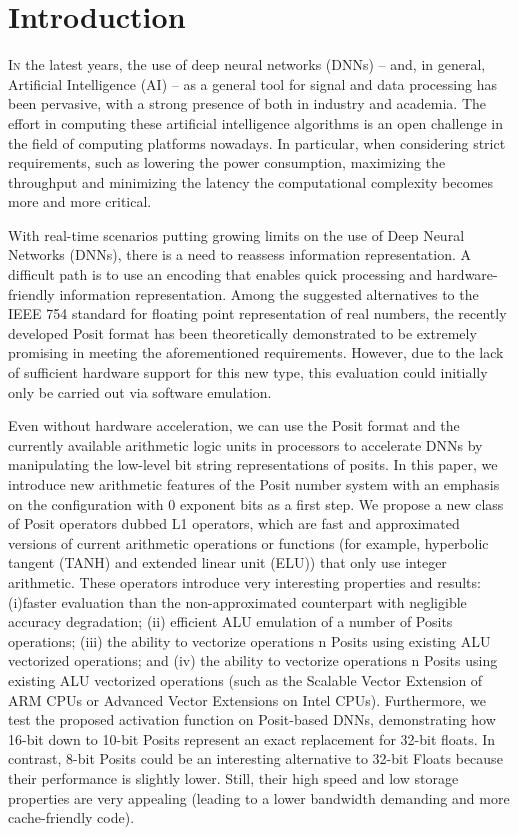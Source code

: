 \chapter{Introduction}
\lettrine{I}{n} the latest years, the use of deep neural networks (DNNs) -- and, in general, Artificial Intelligence (AI) -- as a general tool for signal and data processing has been pervasive, with a strong presence of both in industry and academia. The effort in computing these artificial intelligence algorithms is an open challenge in the field of computing platforms nowadays. In particular, when considering strict requirements, such as lowering the power consumption, maximizing the throughput and minimizing the latency the computational complexity becomes more and more critical.


With real-time scenarios putting growing limits on the use of Deep Neural Networks (DNNs), there is a need to reassess information representation. A difficult path is to use an encoding that enables quick processing and hardware-friendly information representation. Among the suggested alternatives to the IEEE 754 standard for floating point representation of real numbers, the recently developed Posit format has been theoretically demonstrated to be extremely promising in meeting the aforementioned requirements. However, due to the lack of sufficient hardware support for this new type, this evaluation could initially only be carried out via software emulation.

Even without hardware acceleration, we can use the Posit format and the currently available arithmetic logic units in processors to accelerate DNNs by manipulating the low-level bit string representations of posits. In this paper, we introduce new arithmetic features of the Posit number system with an emphasis on the configuration with 0 exponent bits as a first step. We propose a new class of Posit operators dubbed L1 operators, which are fast and approximated versions of current arithmetic operations or functions (for example, hyperbolic tangent (TANH) and extended linear unit (ELU)) that only use integer arithmetic. These operators introduce very interesting properties and results: (i)faster evaluation than the non-approximated counterpart with negligible accuracy degradation; (ii) efficient ALU emulation of a number of Posits operations; (iii) the ability to vectorize operations n Posits using existing ALU vectorized operations; and (iv) the ability to vectorize operations n Posits using existing ALU vectorized operations (such as the Scalable Vector Extension of ARM CPUs or Advanced Vector Extensions on Intel CPUs). Furthermore, we test the proposed activation function on Posit-based DNNs, demonstrating how 16-bit down to 10-bit Posits represent an exact replacement for 32-bit floats. In contrast, 8-bit Posits could be an interesting alternative to 32-bit Floats because their performance is slightly lower. Still, their high speed and low storage properties are very appealing (leading to a lower bandwidth demanding and more cache-friendly code).

